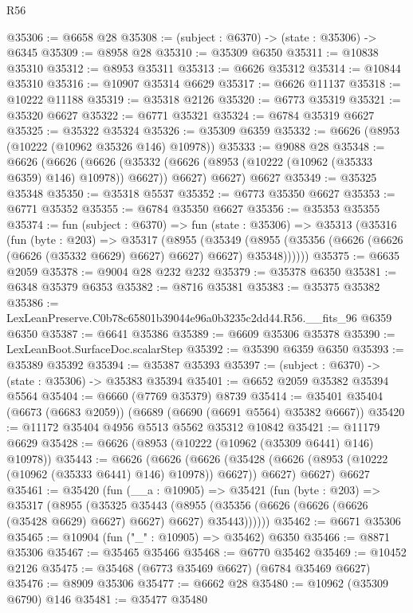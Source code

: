 \begin{lexlean}{R56}
\begin{coremodule}
@35306 := @6658 @28
@35308 := (subject : @6370) -> (state : @35306) -> @6345
@35309 := @8958 @28
@35310 := @35309 @6350
@35311 := @10838 @35310
@35312 := @8953 @35311
@35313 := @6626 @35312
@35314 := @10844 @35310
@35316 := @10907 @35314 @6629
@35317 := @6626 @11137
@35318 := @10222 @11188
@35319 := @35318 @2126
@35320 := @6773 @35319
@35321 := @35320 @6627
@35322 := @6771 @35321
@35324 := @6784 @35319 @6627
@35325 := @35322 @35324
@35326 := @35309 @6359
@35332 := @6626 (@8953 (@10222 (@10962 @35326 @146) @10978))
@35333 := @9088 @28
@35348 := @6626
    (@6626
      (@6626 (@35332 (@6626 (@8953 (@10222 (@10962 (@35333 @6359) @146) @10978)) @6627)) @6627)
      @6627)
    @6627
@35349 := @35325 @35348
@35350 := @35318 @5537
@35352 := @6773 @35350 @6627
@35353 := @6771 @35352
@35355 := @6784 @35350 @6627
@35356 := @35353 @35355
@35374 := fun (subject : @6370) =>
  fun (state : @35306) =>
  @35313
    (@35316
      (fun (byte : @203) =>
      @35317
        (@8955
          (@35349
            (@8955 (@35356 (@6626 (@6626 (@6626 (@35332 @6629) @6627) @6627) @6627) @35348))))))
@35375 := @6635 @2059
@35378 := @9004 @28 @232 @232
@35379 := @35378 @6350
@35381 := @6348 @35379 @6353
@35382 := @8716 @35381
@35383 := @35375 @35382
@35386 := LexLeanPreserve.C0b78c65801b39044e96a0b3235c2dd44.R56.__fits_96 @6359 @6350
@35387 := @6641 @35386
@35389 := @6609 @35306 @35378
@35390 := LexLeanBoot.SurfaceDoc.scalarStep
@35392 := @35390 @6359 @6350
@35393 := @35389 @35392
@35394 := @35387 @35393
@35397 := (subject : @6370) -> (state : @35306) -> @35383 @35394
@35401 := @6652 @2059 @35382 @35394 @5564
@35404 := @6660 (@7769 @35379) @8739
@35414 := @35401 @35404 (@6673 (@6683 @2059)) (@6689 (@6690 (@6691 @5564) @35382 @6667))
@35420 := @11172 @35404 @4956 @5513 @5562 @35312 @10842
@35421 := @11179 @6629
@35428 := @6626 (@8953 (@10222 (@10962 (@35309 @6441) @146) @10978))
@35443 := @6626
    (@6626
      (@6626 (@35428 (@6626 (@8953 (@10222 (@10962 (@35333 @6441) @146) @10978)) @6627)) @6627)
      @6627)
    @6627
@35461 := @35420
    (fun (__a : @10905) =>
    @35421
      (fun (byte : @203) =>
      @35317
        (@8955
          (@35325
            @35443
            (@8955 (@35356 (@6626 (@6626 (@6626 (@35428 @6629) @6627) @6627) @6627) @35443))))))
@35462 := @6671 @35306
@35465 := @10904 (fun ("_" : @10905) => @35462) @6350
@35466 := @8871 @35306
@35467 := @35465 @35466
@35468 := @6770 @35462
@35469 := @10452 @2126
@35475 := @35468 (@6773 @35469 @6627) (@6784 @35469 @6627)
@35476 := @8909 @35306
@35477 := @6662 @28
@35480 := @10962 (@35309 @6790) @146
@35481 := @35477 @35480

\end{coremodule}
\end{lexlean}
